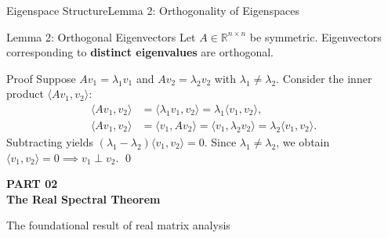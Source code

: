 \documentclass[10pt, aspectratio=169]{beamer}
\newcommand{\hl}[1]{{\color{amber}\textbf{#1}}}
\begin{document}
\begin{frame}{Eigenspace Structure}{Lemma 2: Orthogonality of Eigenspaces}
  \begin{maththeorem}{Lemma 2: Orthogonal Eigenvectors}
    Let $A \in \mathbb{R}^{n \times n}$ be symmetric. Eigenvectors corresponding to \hl{distinct eigenvalues} are orthogonal.
  \end{maththeorem}

  \vspace*{0.1cm}

  \begin{proofstep}{Proof}
    \small
    Suppose $A v_1 = \lambda_1 v_1$ and $A v_2 = \lambda_2 v_2$ with $\lambda_1 \neq \lambda_2$.
    Consider the inner product $\langle A v_1, v_2 \rangle$:
    \begin{align*}
      \langle A v_1, v_2 \rangle &= \langle \lambda_1 v_1, v_2 \rangle = \lambda_1 \langle v_1, v_2 \rangle, \\
      \langle A v_1, v_2 \rangle &= \langle v_1, A v_2 \rangle = \langle v_1, \lambda_2 v_2 \rangle = \lambda_2 \langle v_1, v_2 \rangle.
    \end{align*}
    Subtracting yields $(\lambda_1 - \lambda_2) \langle v_1, v_2 \rangle = 0$.
    Since $\lambda_1 \neq \lambda_2$, we obtain $\langle v_1, v_2 \rangle = 0 \implies v_1 \perp v_2$. \qed
  \end{proofstep}
\end{frame}

\begin{frame}[plain]
  \vspace*{1.8cm}
  \begin{center}
    {\color{teal}\small\bfseries PART 02} \\[0.2cm]
    {\color{navy}\huge\bfseries The Real Spectral Theorem} \\[0.3cm]
    \par\vspace{0.3cm}
    {\color{slate}\small The foundational result of real matrix analysis}
  \end{center}
\end{frame}
\end{document}
